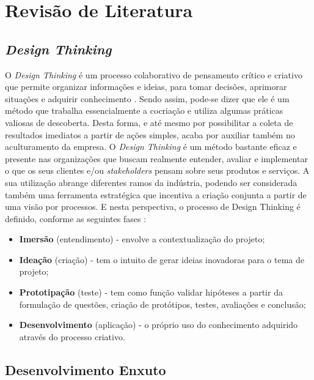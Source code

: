 \documentclass[10pt]{article}
\begin{document}
\section{Revisão de Literatura}\label{sec:literatura}
    \subsection{\textit{Design Thinking}}\label{subsec:literatura-design-think}
        O \textit{Design Thinking} é um processo colaborativo de pensamento crítico e criativo que permite organizar informações e ideias, para tomar decisões, aprimorar situações e adquirir conhecimento \cite{DesignThink:Vianna}. Sendo assim, pode-se dizer que ele é um método que trabalha essencialmente a cocriação e utiliza algumas práticas valiosas de descoberta. Desta forma, e até mesmo por possibilitar a coleta de resultados imediatos a partir de ações simples, acaba por auxiliar também no aculturamento da empresa.
        O \textit{Design Thinking} é um método bastante eficaz e presente nas organizações que buscam realmente entender, avaliar e implementar o que os seus clientes e/ou \textit{stakeholders} pensam sobre seus produtos e serviços. A sua utilização abrange diferentes ramos da indústria, podendo ser considerada também uma ferramenta estratégica que incentiva a criação conjunta a partir de uma visão por processos. E nesta perspectiva, o processo de Design Thinking é definido, conforme as seguintes fases \cite{DesignThink:Vianna}:
        
        \begin{itemize}
            \item \textbf{Imersão} (entendimento) - envolve a contextualização do projeto;
            \item \textbf{Ideação} (criação) - tem o intuito de gerar ideias inovadoras para o tema de projeto;
            \item \textbf{Prototipação} (teste) - tem como função validar hipóteses a partir da formulação de questões, criação de protótipos, testes, avaliações e conclusão;
            \item \textbf{Desenvolvimento} (aplicação) - o próprio uso do conhecimento adquirido através do processo criativo.
        \end{itemize}
        
    \subsection{Desenvolvimento Enxuto}\label{subsec:literatura-lean}
        
\end{document}
